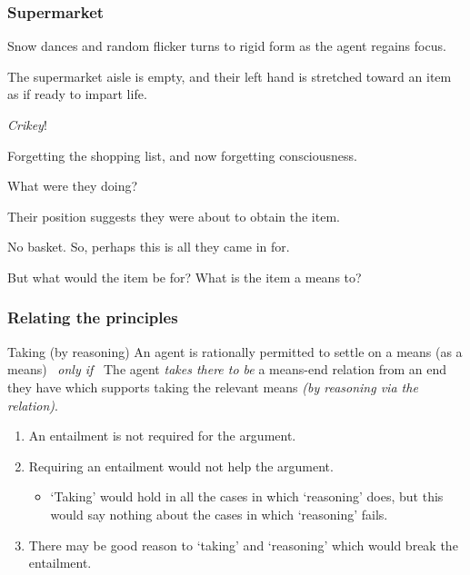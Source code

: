 \documentclass[noamssymb, compress, handout]{beamer} %
\begin{document}
\begin{frame}
  \frametitle{Supermarket}

  {\rmfamily

    Snow dances and random flicker turns to rigid form as the agent regains focus.

    The supermarket aisle is empty, and their left hand is stretched toward an item as if ready to impart life.

    \emph{Crikey}!

    Forgetting the shopping list, and now forgetting consciousness.

    What were they doing?

    Their position suggests they were about to obtain the item.

    No basket. So, perhaps this is all they came in for.

    But what would the item be for?  What is the item a means to?

  }
\end{frame}


\begin{frame}
  \frametitle{Relating the principles}

  \begin{block}{Taking (by reasoning)}
    An agent is rationally permitted to settle on a means (as a means)
    \newline
    \mbox{ }\hfill\emph{only if}\hfill\mbox{ }
    \newline
    The agent \emph{takes there to be}  a means-end relation from an end they have which supports taking the relevant means \emph{(by reasoning via the relation)}.
  \end{block}

  \begin{enumerate}
  \item An entailment is not required for the argument.
  \item Requiring an entailment would not help the argument.
    \begin{itemize}
    \item `Taking' would hold in all the cases in which `reasoning' does, but this would say nothing about the cases in which `reasoning' fails.
    \end{itemize}
  \item There may be good reason to `taking' and `reasoning' which would break the entailment.
  \end{enumerate}
\end{frame}
\end{document}
